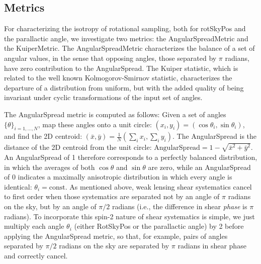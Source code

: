 \subsection{Metrics}

For characterizing the isotropy of rotational sampling, both for rotSkyPos and
the parallactic angle, we investigate two metrics: the AngularSpreadMetric and
the KuiperMetric.  The AngularSpreadMetric characterizes the balance of a set of
angular values, in the sense that opposing angles, those separated by $\pi$
radians, have zero contribution to the AngularSpread.  The Kuiper statistic,
which is related to the well known Kolmogorov-Smirnov statistic, characterizes
the departure of a distribution from uniform, but with the added quality of
being invariant under cyclic transformations of the input set of angles.

The AngularSpread metric is computed as follows:  Given a set of angles
$\{\theta\}_{i=1, ..., N}$, map these angles onto a unit circle: $(x_i, y_i) =
(\cos \theta_i, \sin \theta_i)$, and find the 2D centroid: $(\bar{x}, \bar{y}) =
\frac{1}{N} (\sum_i x_i, \sum_i y_i)$.  The AngularSpread is the distance of the
2D centroid from the unit circle: $\mathrm{AngularSpread} = 1 - \sqrt{\bar{x}^2 +
\bar{y}^2}$.  An AngularSpread of 1 therefore corresponds to a perfectly
balanced distribution, in which the averages of both $\cos \theta$ and $\sin
\theta$ are zero, while an AngularSpread of 0 indicates a maximally anisotropic
distribution in which every angle is identical: $\theta_i = \mathrm{const}$.  As
mentioned above, weak lensing shear systematics cancel to first order when those
systematics are separated not by an angle of $\pi$ radians on the sky, but by an
angle of $\pi/2$ radians (i.e., the difference in shear \emph{phase} is $\pi$
radians).  To incorporate this spin-2 nature of shear systematics is simple, we
just multiply each angle $\theta_i$ (either RotSkyPos or the parallactic angle)
by 2 before applying the AngularSpread metric, so that, for example, pairs of
angles separated by $\pi/2$ radians on the sky are separated by $\pi$ radians in
shear phase and correctly cancel.

